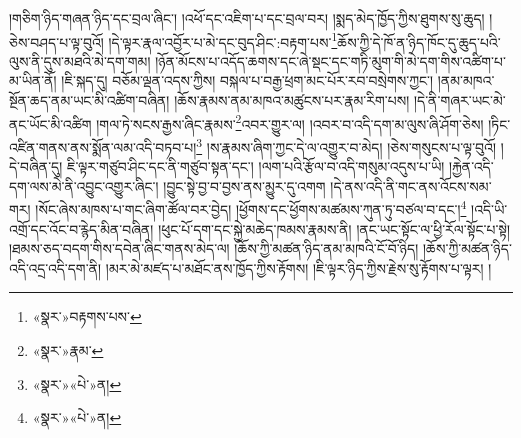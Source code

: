 །གཅིག་ཉིད་གཞན་ཉིད་དང་བྲལ་ཞིང་། །འཕོ་དང་འཇིག་པ་དང་བྲལ་བར། །སྨད་མེད་ཁྱོད་ཀྱིས་ཐུགས་སུ་ཆུད། །ཅེས་བཤད་པ་ལྟ་བུའོ། །དེ་ལྟར་རྣལ་འབྱོར་པ་མེ་དང་བུད་ཤིང་:བརྟག་པས་\footnote{«སྣར་»བརྟགས་པས་}ཆོས་ཀྱི་དེ་ཁོ་ན་ཉིད་ཁོང་དུ་ཆུད་པའི་ལུས་ནི་དུས་མཐའི་མེ་དག་གམ། །ཉོན་མོངས་པ་འདོད་ཆགས་དང་ཞེ་སྡང་དང་གཏི་མུག་གི་མེ་དག་གིས་འཚིག་པ་མ་ཡིན་ནོ། །ཇི་སྐད་དུ། བཅོམ་ལྡན་འདས་ཀྱིས། བསྐལ་པ་བརྒྱ་ཕྲག་མང་པོར་རབ་བསྲེགས་ཀྱང་། །ནམ་མཁའ་སྔོན་ཆད་ནམ་ཡང་མི་འཚིག་བཞིན། །ཆོས་རྣམས་ནམ་མཁའ་མཚུངས་པར་རྣམ་རིག་པས། །དེ་ནི་གཞར་ཡང་མེ་ནང་ཡོང་མི་འཚིག །གལ་ཏེ་སངས་རྒྱས་ཞིང་རྣམས་\footnote{«སྣར་»རྣམ་}འབར་གྱུར་ལ། །འབར་བ་འདི་དག་མ་ལུས་ཞི་ཤོག་ཅེས། །ཏིང་འཛིན་གནས་ནས་སྨོན་ལམ་འདི་བཏབ་པ།\footnote{«སྣར་»«པེ་»ན།} །ས་རྣམས་ཞིག་ཀྱང་དེ་ལ་འགྱུར་བ་མེད། །ཅེས་གསུངས་པ་ལྟ་བུའོ། །དེ་བཞིན་དུ། ཇི་ལྟར་གཙུབ་ཤིང་དང་ནི་གཙུབ་སྟན་དང་། །ལག་པའི་རྩོལ་བ་འདི་གསུམ་འདུས་པ་ཡི། །རྐྱེན་འདི་དག་ལས་མེ་ནི་འབྱུང་འགྱུར་ཞིང་། །བྱུང་སྟེ་བྱ་བ་བྱས་ནས་མྱུར་དུ་འགག །དེ་ནས་འདི་ནི་གང་ནས་འོངས་སམ་གར། །སོང་ཞེས་མཁས་པ་གང་ཞིག་ཚོལ་བར་བྱེད། །ཕྱོགས་དང་ཕྱོགས་མཚམས་ཀུན་ཏུ་བཙལ་བ་དང་།\footnote{«སྣར་»«པེ་»ན།} །འདི་ཡི་འགྲོ་དང་འོང་བ་རྙེད་མིན་བཞིན། །ཕུང་པོ་དག་དང་སྐྱེ་མཆེད་ཁམས་རྣམས་ནི། །ནང་ཡང་སྟོང་ལ་ཕྱི་རོལ་སྟོང་པ་སྟེ། །ཐམས་ཅད་བདག་གིས་དབེན་ཞིང་གནས་མེད་ལ། །ཆོས་ཀྱི་མཚན་ཉིད་ནམ་མཁའི་ངོ་བོ་ཉིད། །ཆོས་ཀྱི་མཚན་ཉིད་འདི་འདྲ་འདི་དག་ནི། །མར་མེ་མཛད་པ་མཐོང་ནས་ཁྱོད་ཀྱིས་རྟོགས། །ཇི་ལྟར་ཉིད་ཀྱིས་རྗེས་སུ་རྟོགས་པ་ལྟར། །
